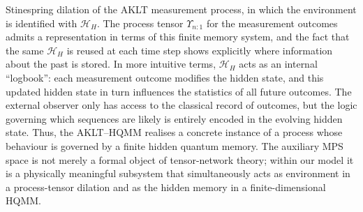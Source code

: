 \documentclass[11pt,a4paper]{article}
\begin{document}
Stinespring dilation of the AKLT measurement process, in which the environment is identified with $\mathcal{H}_H$. The process tensor $\Upsilon_{n:1}$ for the measurement outcomes admits a representation in terms of this finite memory system, and the fact that the same $\mathcal{H}_H$ is reused at each time step shows explicitly where information about the past is stored. In more intuitive terms, $\mathcal{H}_H$ acts as an internal ``logbook'': each measurement outcome modifies the hidden state, and this updated hidden state in turn influences the statistics of all future outcomes. The external observer only has access to the classical record of outcomes, but the logic governing which sequences are likely is entirely encoded in the evolving hidden state. Thus, the AKLT--HQMM realises a concrete instance of a process whose behaviour is governed by a finite hidden quantum memory. The auxiliary MPS space is not merely a formal object of tensor-network theory; within our model it is a physically meaningful subsystem that simultaneously acts as environment in a process-tensor dilation and as the hidden memory in a finite-dimensional HQMM.

\end{document}
